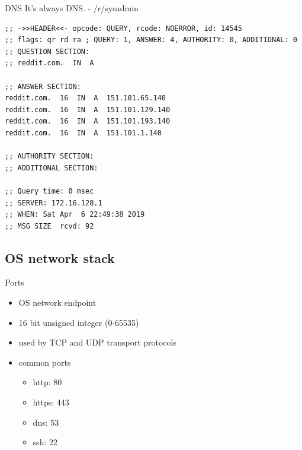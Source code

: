 \documentclass{beamer}
\begin{document}
\begin{frame}[fragile]{DNS}
  It's always DNS. - /r/sysadmin
  \scriptsize
  \begin{lstlisting}
;; ->>HEADER<<- opcode: QUERY, rcode: NOERROR, id: 14545
;; flags: qr rd ra ; QUERY: 1, ANSWER: 4, AUTHORITY: 0, ADDITIONAL: 0
;; QUESTION SECTION:
;; reddit.com.  IN  A

;; ANSWER SECTION:
reddit.com.  16  IN  A  151.101.65.140
reddit.com.  16  IN  A  151.101.129.140
reddit.com.  16  IN  A  151.101.193.140
reddit.com.  16  IN  A  151.101.1.140

;; AUTHORITY SECTION:
;; ADDITIONAL SECTION:

;; Query time: 0 msec
;; SERVER: 172.16.128.1
;; WHEN: Sat Apr  6 22:49:38 2019
;; MSG SIZE  rcvd: 92
  \end{lstlisting}
\end{frame}

\subsection{OS network stack}

\begin{frame}{Ports}
  \begin{itemize}
    \item OS network endpoint
    \item 16 bit unsigned integer (0-65535)
    \item used by TCP and UDP transport protocols
    \item common ports \begin{itemize}
      \small
      \item http: 80
      \item https: 443
      \item dns: 53
      \item ssh: 22
    \end{itemize}
  \end{itemize}
\end{frame}
\end{document}

